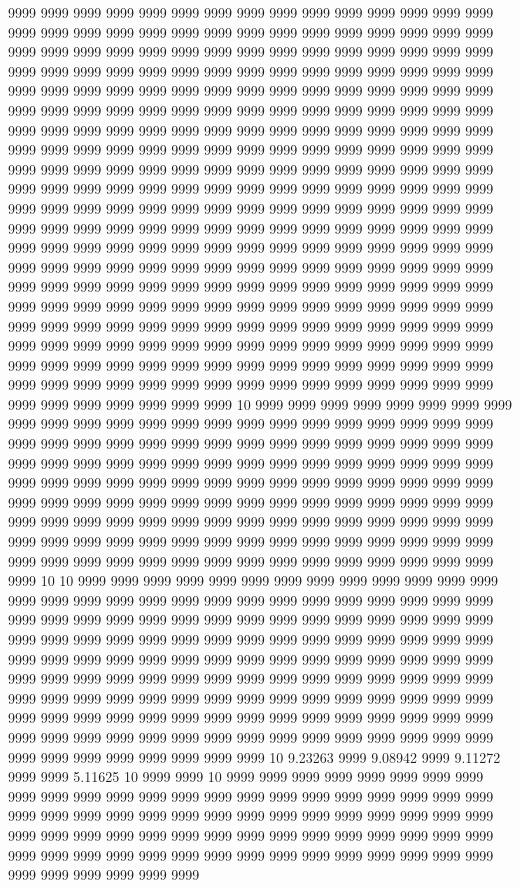 9999 9999 9999 9999 9999 9999 9999 9999 9999 9999 9999 9999 9999 9999 9999 9999 9999 9999 9999 9999 9999 9999 9999 9999 9999 9999 9999 9999 9999 9999 9999 9999 9999 9999 9999 9999 9999 9999 9999 9999 9999 9999 9999 9999 9999 9999 9999 9999 9999 9999 9999 9999 9999 9999 9999 9999 9999 9999 9999 9999 9999 9999 9999 9999 9999 9999 9999 9999 9999 9999 9999 9999 9999 9999 9999 9999 9999 9999 9999 9999 9999 9999 9999 9999 9999 9999 9999 9999 9999 9999 9999 9999 9999 9999 9999 9999 9999 9999 9999 9999 9999 9999 9999 9999 9999 9999 9999 9999 9999 9999 9999 9999 9999 9999 9999 9999 9999 9999 9999 9999 9999 9999 9999 9999 9999 9999 9999 9999 9999 9999 9999 9999 9999 9999 9999 9999 9999 9999 9999 9999 9999 9999 9999 9999 9999 9999 9999 9999 9999 9999 9999 9999 9999 9999 9999 9999 9999 9999 9999 9999 9999 9999 9999 9999 9999 9999 9999 9999 9999 9999 9999 9999 9999 9999 9999 9999 9999 9999 9999 9999 9999 9999 9999 9999 9999 9999 9999 9999 9999 9999 9999 9999 9999 9999 9999 9999 9999 9999 9999 9999 9999 9999 9999 9999 9999 9999 9999 9999 9999 9999 9999 9999 9999 9999 9999 9999 9999 9999 9999 9999 9999 9999 9999 9999 9999 9999 9999 9999 9999 9999 9999 9999 9999 9999 9999 9999 9999 9999 9999 9999 9999 9999 9999 9999 9999 9999 9999 9999 9999 9999 9999 9999 9999 9999 9999 9999 9999 9999 9999 9999 9999 9999 9999 9999 9999 9999 9999 9999 9999 9999 9999 9999 9999 9999 9999 9999 9999 9999 9999 9999 9999 9999 9999 9999 9999 9999 9999 9999 9999 9999 9999 9999 9999 9999 9999 9999 9999 9999 9999 9999 9999 9999 9999 9999 9999 9999 9999 10 9999 9999 9999 9999 9999 9999 9999 9999 9999 9999 9999 9999 9999 9999 9999 9999 9999 9999 9999 9999 9999 9999 9999 9999 9999 9999 9999 9999 9999 9999 9999 9999 9999 9999 9999 9999 9999 9999 9999 9999 9999 9999 9999 9999 9999 9999 9999 9999 9999 9999 9999 9999 9999 9999 9999 9999 9999 9999 9999 9999 9999 9999 9999 9999 9999 9999 9999 9999 9999 9999 9999 9999 9999 9999 9999 9999 9999 9999 9999 9999 9999 9999 9999 9999 9999 9999 9999 9999 9999 9999 9999 9999 9999 9999 9999 9999 9999 9999 9999 9999 9999 9999 9999 9999 9999 9999 9999 9999 9999 9999 9999 9999 9999 9999 9999 9999 9999 9999 9999 9999 9999 9999 9999 9999 9999 9999 9999 9999 9999 10 10 9999 9999 9999 9999 9999 9999 9999 9999 9999 9999 9999 9999 9999 9999 9999 9999 9999 9999 9999 9999 9999 9999 9999 9999 9999 9999 9999 9999 9999 9999 9999 9999 9999 9999 9999 9999 9999 9999 9999 9999 9999 9999 9999 9999 9999 9999 9999 9999 9999 9999 9999 9999 9999 9999 9999 9999 9999 9999 9999 9999 9999 9999 9999 9999 9999 9999 9999 9999 9999 9999 9999 9999 9999 9999 9999 9999 9999 9999 9999 9999 9999 9999 9999 9999 9999 9999 9999 9999 9999 9999 9999 9999 9999 9999 9999 9999 9999 9999 9999 9999 9999 9999 9999 9999 9999 9999 9999 9999 9999 9999 9999 9999 9999 9999 9999 9999 9999 9999 9999 9999 9999 9999 9999 9999 9999 9999 9999 9999 9999 9999 9999 9999 9999 9999 9999 9999 9999 9999 9999 9999 9999 10 9.23263 9999 9.08942 9999 9.11272 9999 9999 5.11625 10 9999 9999 10 9999 9999 9999 9999 9999 9999 9999 9999 9999 9999 9999 9999 9999 9999 9999 9999 9999 9999 9999 9999 9999 9999 9999 9999 9999 9999 9999 9999 9999 9999 9999 9999 9999 9999 9999 9999 9999 9999 9999 9999 9999 9999 9999 9999 9999 9999 9999 9999 9999 9999 9999 9999 9999 9999 9999 9999 9999 9999 9999 9999 9999 9999 9999 9999 9999 9999 9999 9999 9999 9999 9999 9999 9999 9999 
